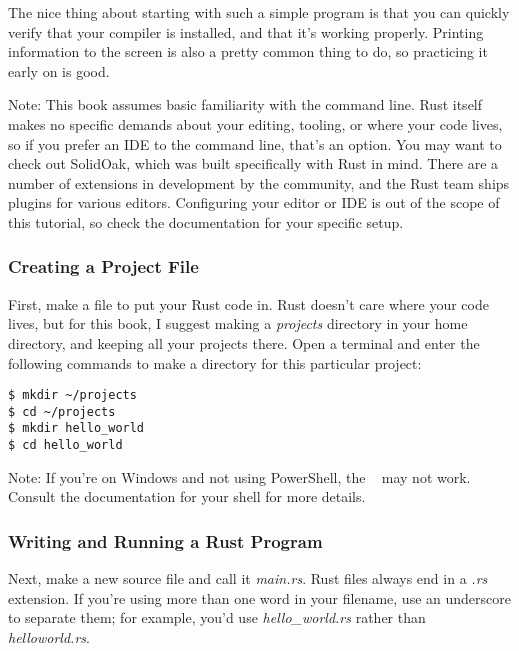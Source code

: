 \blank

The nice thing about starting with such a simple program is that you can quickly verify that your compiler is installed, 
and that it's working properly. Printing information to the screen is also a pretty common thing to do, so practicing it 
early on is good.

\begin{myquote}
    Note: This book assumes basic familiarity with the command line. Rust itself makes no specific demands about your editing,
    tooling, or where your code lives, so if you prefer an IDE to the command line, that's an option. You may want to check out
    SolidOak, which was built specifically with Rust in mind. There are a number of extensions in development by the community, 
    and the Rust team ships plugins for various editors. Configuring your editor or IDE is out of the scope of this tutorial, so
    check the documentation for your specific setup.
\end{myquote}

\subsubsection*{Creating a Project File}

First, make a file to put your Rust code in. Rust doesn't care where your code lives, but for this book, I suggest making a 
\emph{projects} directory in your home directory, and keeping all your projects there. Open a terminal and enter the following 
commands to make a directory for this particular project:

\begin{verbatim}
$ mkdir ~/projects
$ cd ~/projects
$ mkdir hello_world
$ cd hello_world
\end{verbatim}

\begin{myquote}
Note: If you’re on Windows and not using PowerShell, the ~ may not work. Consult the documentation for your shell for more details.
\end{myquote}

\subsubsection*{Writing and Running a Rust Program}

Next, make a new source file and call it \emph{main.rs}. Rust files always end in a \emph{.rs} extension. If you’re using more 
than one word in your filename, use an underscore to separate them; for example, you'd use \emph{hello\_world.rs} rather than 
\emph{helloworld.rs}.

